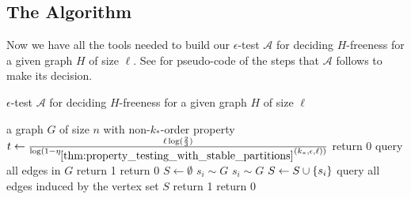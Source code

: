     \subsection{The Algorithm} \label{subsec:subsection_6.2}

        Now we have all the tools needed to build our $\epsilon$-test $\mathcal{A}$ for deciding $H$-freeness for a given
        graph $H$ of size $\ell$.
        See  for pseudo-code of the steps that $\mathcal{A}$ follows to make its decision.

        \begin{algorithm}[H]
            \caption{$\epsilon$-test $\mathcal{A}$ for deciding $H$-freeness for a given graph $H$ of size $\ell$}
            \label{alg:h-freeness_tester}
            \begin{algorithmic}[1]
                \Require a graph $G$ of size $n$ with non-$k_*$-order property
                \State $t \leftarrow \frac{\ell \log( \frac{2}{3} )}
                    {\log( 1 - \eta_{\ref{thm:property_testing_with_stable_partitions}}(k_*, \epsilon, \ell) )}$
                    \State return 0 \label{line:G_smaller_then_H}
                    \State query all edges in $G$
                        \State return 1 \label{line:G_small_enough_found_H}
                    \Else
                        \State return 0 \label{line:G_small_enough_not_found_H}
                    \EndIf
                \Else \label{line:random_sampling}
                    \State $S \leftarrow \emptyset$
                        \State $s_{i} \sim G$
                            \State $s_{i} \sim G$
                        \EndWhile
                        \State $S \leftarrow S \cup \{ s_i \}$
                    \EndWhile
                    \State query all edges induced by the vertex set $S$
                        \State return 1 \label{line:found_H}
                    \Else
                        \State return 0 \label{line:not_found_H}
                    \EndIf
                \EndIf
            \end{algorithmic}
        \end{algorithm}

